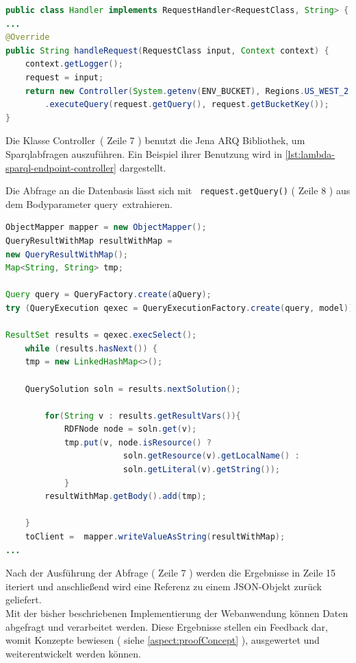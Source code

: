 \documentclass[
12pt,
english,
ngerman,
headsepline,
twoside,
openright,
numbers=noenddot,version=first
]{scrreprt}
\begin{document}
\begin{lstlisting}[language=Java,caption={Lambda Sparql-Endpoint},label={lst:lambda-sparql-endpoint}]
public class Handler implements RequestHandler<RequestClass, String> {
...
@Override
public String handleRequest(RequestClass input, Context context) {
	context.getLogger();
	request = input;
	return new Controller(System.getenv(ENV_BUCKET), Regions.US_WEST_2.getName())
		.executeQuery(request.getQuery(), request.getBucketKey());
}
\end{lstlisting}

Die Klasse \glqq Controller\grqq\ ( Zeile 7 ) benutzt die Jena ARQ Bibliothek, um Sparqlabfragen auszuführen. Ein Beispiel ihrer Benutzung wird in \autoref{lst:lambda-sparql-endpoint-controller} dargestellt. 

Die Abfrage an die Datenbasis lässt sich mit \lstinline| request.getQuery()| ( Zeile 8 ) aus dem Bodyparameter \glqq query\grqq\ extrahieren.

\begin{lstlisting}[language=Java,caption={Lambda Sparql-Endpoint-Controller},label={lst:lambda-sparql-endpoint-controller}]
ObjectMapper mapper = new ObjectMapper();
QueryResultWithMap resultWithMap =
new QueryResultWithMap();
Map<String, String> tmp;

Query query = QueryFactory.create(aQuery);
try (QueryExecution qexec = QueryExecutionFactory.create(query, model)) {

ResultSet results = qexec.execSelect();
	while (results.hasNext()) {
	tmp = new LinkedHashMap<>();

	QuerySolution soln = results.nextSolution();

		for(String v : results.getResultVars()){
			RDFNode node = soln.get(v);
			tmp.put(v, node.isResource() ?
						soln.getResource(v).getLocalName() :
						soln.getLiteral(v).getString());
			}
		resultWithMap.getBody().add(tmp);

	}
	toClient =  mapper.writeValueAsString(resultWithMap);
...
\end{lstlisting}

Nach der Ausführung der Abfrage ( Zeile 7 ) werden die Ergebnisse in Zeile 15 iteriert und anschließend wird eine Referenz zu einem \acrshort{JSON}-Objekt zurück geliefert.\\

Mit der bisher beschriebenen Implementierung der Webanwendung können Daten abgefragt und verarbeitet werden. Diese Ergebnisse stellen ein Feedback dar, womit Konzepte bewiesen ( siehe \autoref{aspect:proofConcept} ), ausgewertet und weiterentwickelt werden können. %
\end{document}
